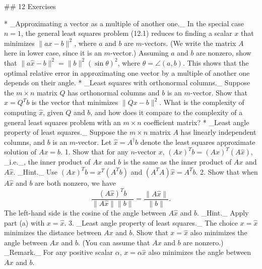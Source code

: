 

## 12 Exercises

* _Approximating a vector as a multiple of another one._ In the special case \(n=1\), the general least squares problem (12.1) reduces to finding a scalar \(x\) that minimizes \(\|ax-b\|^{2}\), where \(a\) and \(b\) are \(m\)-vectors. (We write the matrix \(A\) here in lower case, since it is an \(m\)-vector.) Assuming \(a\) and \(b\) are nonzero, show that \(\|a\hat{x}-b\|^{2}=\|b\|^{2}(\sin\theta)^{2}\), where \(\theta=\angle(a,b)\). This shows that the optimal relative error in approximating one vector by a multiple of another one depends on their angle.
* _Least squares with orthonormal columns._ Suppose the \(m\times n\) matrix \(Q\) has orthonormal columns and \(b\) is an \(m\)-vector. Show that \(\hat{x}=Q^{T}b\) is the vector that minimizes \(\|Qx-b\|^{2}\). What is the complexity of computing \(\hat{x}\), given \(Q\) and \(b\), and how does it compare to the complexity of a general least squares problem with an \(m\times n\) coefficient matrix?
* _Least angle property of least squares._ Suppose the \(m\times n\) matrix \(A\) has linearly independent columns, and \(b\) is an \(m\)-vector. Let \(\hat{x}=A^{\dagger}b\) denote the least squares approximate solution of \(Ax=b\). 1. Show that for any \(n\)-vector \(x\), \((Ax)^{T}b=(Ax)^{T}(A\hat{x})\), _i.e._, the inner product of \(Ax\) and \(b\) is the same as the inner product of \(Ax\) and \(A\hat{x}\). _Hint._ Use \((Ax)^{T}b=x^{T}(A^{T}b)\) and \((A^{T}A)\hat{x}=A^{T}b\). 2. Show that when \(A\hat{x}\) and \(b\) are both nonzero, we have \[\frac{(A\hat{x})^{T}b}{\|A\hat{x}\|\|b\|}=\frac{\|A\hat{x}\|}{\|b\|}.\] The left-hand side is the cosine of the angle between \(A\hat{x}\) and \(b\). _Hint._ Apply part (a) with \(x=\hat{x}\). 3. _Least angle property of least squares._ The choice \(x=\hat{x}\) minimizes the distance between \(Ax\) and \(b\). Show that \(x=\hat{x}\) also minimizes the angle between \(Ax\) and \(b\). (You can assume that \(Ax\) and \(b\) are nonzero.) _Remark._ For any positive scalar \(\alpha\), \(x=\alpha\hat{x}\) also minimizes the angle between \(Ax\) and \(b\).
